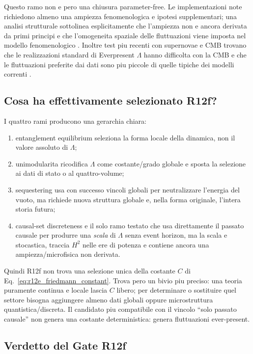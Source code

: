 \documentclass[11pt,a4paper]{article}
\begin{document}
Questo ramo non e pero una chiusura parameter-free. Le implementazioni note richiedono almeno una ampiezza fenomenologica e ipotesi supplementari; una analisi strutturale sottolinea esplicitamente che l'ampiezza non e ancora derivata da primi principi e che l'omogeneita spaziale delle fluttuazioni viene imposta nel modello fenomenologico \cite{AhmedSorkin2012}. Inoltre test piu recenti con supernovae e CMB trovano che le realizzazioni standard di Everpresent $\Lambda$ hanno difficolta con la CMB e che le fluttuazioni preferite dai dati sono piu piccole di quelle tipiche dei modelli correnti \cite{DasNasiriYazdi2023}.

\subsection{Cosa ha effettivamente selezionato R12f?}

I quattro rami producono una gerarchia chiara:
\begin{enumerate}
\item entanglement equilibrium seleziona la forma locale della dinamica, non il valore assoluto di $\Lambda$;
\item unimodularita ricodifica $\Lambda$ come costante/grado globale e sposta la selezione ai dati di stato o al quattro-volume;
\item sequestering usa con successo vincoli globali per neutralizzare l'energia del vuoto, ma richiede nuova struttura globale e, nella forma originale, l'intera storia futura;
\item causal-set discreteness e il solo ramo testato che usa direttamente il passato causale per produrre una \emph{scala} di $\Lambda$ senza event horizon, ma la scala e stocastica, traccia $H^2$ nelle ere di potenza e contiene ancora una ampiezza/microfisica non derivata.
\end{enumerate}

Quindi R12f non trova una selezione unica della costante $C$ di Eq.~\eqref{eq:r12e_friedmann_constant}. Trova pero un bivio piu preciso: una teoria puramente continua e locale lascia $C$ libero; per determinare o sostituire quel settore bisogna aggiungere almeno dati globali oppure microstruttura quantistica/discreta. Il candidato piu compatibile con il vincolo ``solo passato causale'' non genera una costante deterministica: genera fluttuazioni ever-present.

\subsection{Verdetto del Gate R12f}
\end{document}
